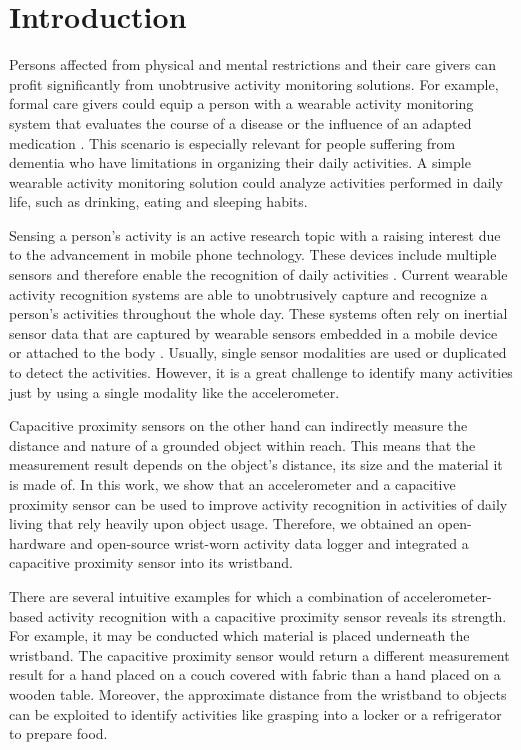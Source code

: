 \documentclass[runningheads,a4paper]{llncs}
\begin{document}
\section{Introduction}

Persons affected from physical and mental restrictions and their care givers can profit significantly from unobtrusive activity monitoring solutions. For example, formal care givers could equip a person with a wearable activity monitoring system that evaluates the course of a disease or the influence of an adapted medication \cite{Muhlsteff2004a}. This scenario is especially relevant for people suffering from dementia who have limitations in organizing their daily activities. A simple wearable activity monitoring solution could analyze activities performed in daily life, such as drinking, eating and sleeping habits. 

Sensing a person's activity is an active research topic with a raising interest due to the advancement in mobile phone technology. These devices include multiple sensors and therefore enable the recognition of daily activities \cite{brezmes2009activity}. Current wearable activity recognition systems are able to unobtrusively capture and recognize a person's activities throughout the whole day. These systems often rely on inertial sensor data that are captured by wearable sensors embedded in a mobile device \cite{brezmes2009activity} or attached to the body \cite{Ravi2005}. Usually, single sensor modalities are used or duplicated to detect the activities. However, it is a great challenge to identify many activities just by using a single modality like the accelerometer.

Capacitive proximity sensors on the other hand can indirectly measure the distance and nature of a grounded object within reach. This means that the measurement result depends on the object's distance, its size and the material it is made of. In this work, we show that an accelerometer and a capacitive proximity sensor can be used to improve activity recognition in activities of daily living that rely heavily upon object usage. Therefore, we obtained an open-hardware and open-source wrist-worn activity data logger \cite{hedgehog} and integrated a capacitive proximity sensor into its wristband. 

There are several intuitive examples for which a combination of accelerometer-based activity recognition with a capacitive proximity sensor reveals its strength. For example, it may be conducted which material is placed underneath the wristband. The capacitive proximity sensor would return a different measurement result for a hand placed on a couch covered with fabric than a hand placed on a wooden table. Moreover, the approximate distance from the wristband to objects can be exploited to identify activities like grasping into a locker or a refrigerator to prepare food.
\end{document}
